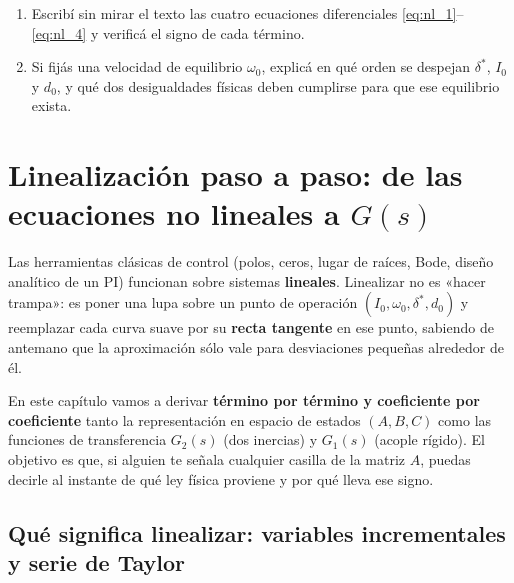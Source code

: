 \documentclass[11pt,a4paper,oneside]{book}
\begin{document}
\begin{lapizypapel}
\begin{enumerate}[leftmargin=1.5em]
  \item Escribí sin mirar el texto las cuatro ecuaciones diferenciales
        \eqref{eq:nl_1}--\eqref{eq:nl_4} y verificá el signo de cada término.
  \item Si fijás una velocidad de equilibrio $\omega_0$, explicá en qué orden se
        despejan $\delta^\ast$, $I_0$ y $d_0$, y qué dos desigualdades físicas
        deben cumplirse para que ese equilibrio exista.
\end{enumerate}
\end{lapizypapel}

\chapter{Linealización paso a paso: de las ecuaciones no lineales a \texorpdfstring{$G(s)$}{G(s)}}\label{cap:linealizacion}

\begin{ideafisica}
Las herramientas clásicas de control (polos, ceros, lugar de raíces, Bode,
diseño analítico de un PI) funcionan sobre sistemas \textbf{lineales}.
Linealizar no es «hacer trampa»: es poner una lupa sobre un punto de operación
$(I_0, \omega_0, \delta^\ast, d_0)$ y reemplazar cada curva suave por su
\textbf{recta tangente} en ese punto, sabiendo de antemano que la aproximación
sólo vale para desviaciones pequeñas alrededor de él.
\end{ideafisica}

En este capítulo vamos a derivar \textbf{término por término y coeficiente por
coeficiente} tanto la representación en espacio de estados $(A, B, C)$ como las
funciones de transferencia $G_2(s)$ (dos inercias) y $G_1(s)$ (acople rígido).
El objetivo es que, si alguien te señala cualquier casilla de la matriz $A$,
puedas decirle al instante de qué ley física proviene y por qué lleva ese signo.

\section{Qué significa linealizar: variables incrementales y serie de Taylor}
\end{document}
